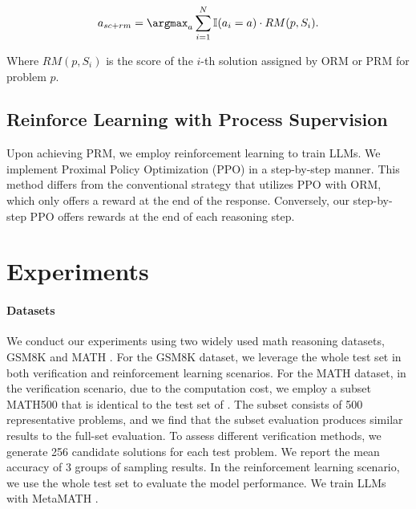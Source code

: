 \begin{equation}
    a_{sc+rm} = \argmax_{a} \sum_{i=1}^N \mathbb{I}(a_i = a) \cdot RM(p, S_i).
\end{equation}

Where $RM(p, S_i)$ is the score of the $i$-th solution assigned by ORM or PRM for problem $p$.

\subsection{Reinforce Learning with Process Supervision} Upon achieving PRM, we employ reinforcement learning to train LLMs. We implement Proximal Policy Optimization (PPO) in a step-by-step manner. This method differs from the conventional strategy that utilizes PPO with ORM, which only offers a reward at the end of the response. Conversely, our step-by-step PPO offers rewards at the end of each reasoning step.

\section{Experiments}

\paragraph{Datasets}
We conduct our experiments using two widely used math reasoning datasets, GSM8K \citep{cobbe2021training} and MATH \citep{MATH}. For the GSM8K dataset, we leverage the whole test set in both verification and reinforcement learning scenarios. For the MATH dataset, in the verification scenario, due to the computation cost,  we employ a subset MATH500 that is identical to the test set of \citet{lightman2023let}. The subset consists of 500 representative problems, and we find that the subset evaluation produces similar results to the full-set evaluation. To assess different verification methods, we generate 256 candidate solutions for each test problem. We report the mean accuracy of $3$ groups of sampling results. In the reinforcement learning scenario, we use the whole test set to evaluate the model performance. We train LLMs with MetaMATH \citep{yu2023metamath}.

